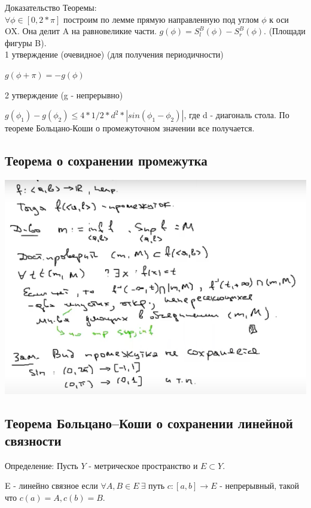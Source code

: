 Доказательство Теоремы: \\

$\forall \phi \in [0,2*\pi]$ построим по лемме прямую направленную под углом $\phi$ к оси OX. Она делит A на равновеликие части. $g(\phi) = S^B_l(\phi) - S^B_r(\phi)$. (Площади фигуры B). \\

1 утверждение (очевидное) (для получения периодичности)

$g(\phi + \pi) = -g(\phi)$

2 утверждение (g - непрерывно)

$g(\phi_1) - g(\phi_2) \leq 4* 1/2 * d^2 * |sin(\phi_1 - \phi_2)|$, где d - диагональ стола.
По теореме Больцано-Коши о промежуточном значении все получается.


\newpage
\subsection{Теорема о сохранении промежутка}

\includegraphics[scale=0.7]{Images/Сохранение промежутка.png}



\newpage
\subsection{Теорема Больцано--Коши о сохранении линейной связности}

Определение: Пусть $Y$ - метрическое пространство и $E \subset Y$.

E - линейно связное если $\forall A,B \in E \  \exists$ путь $c:[a,b] \to E$ - непрерывный, такой что $c(a) = A, c(b) = B$.\\

